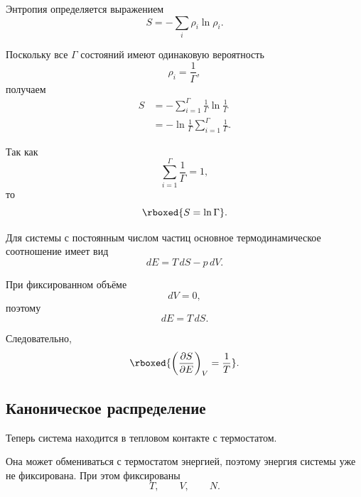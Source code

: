 \documentclass[../final.tex]{subfiles}
\begin{document}
Энтропия определяется выражением
%
\begin{equation*}
    S
    =
    -\sum_i
    \rho_i\ln\rho_i.
\end{equation*}

Поскольку все $\Gamma$ состояний имеют одинаковую вероятность
%
\begin{equation*}
    \rho_i
    =
    \frac{1}{\Gamma},
\end{equation*}
%
получаем
%
\begin{align*}
    S
    &=
    -\sum_{i=1}^{\Gamma}
    \frac{1}{\Gamma}
    \ln\frac{1}{\Gamma}
    \\[4pt]
    &=
    -\ln\frac{1}{\Gamma}
    \sum_{i=1}^{\Gamma}
    \frac{1}{\Gamma}.
\end{align*}

Так как
%
\begin{equation*}
    \sum_{i=1}^{\Gamma}
    \frac{1}{\Gamma}
    =
    1,
\end{equation*}
%
то
%
\[
    \rboxed{
        S = \ln\Gamma
    }.
\]

Для системы с постоянным числом частиц основное термодинамическое
соотношение имеет вид
%
\begin{equation*}
    dE
    =
    T\,dS
    -
    p\,dV.
\end{equation*}

При фиксированном объёме
%
\begin{equation*}
    dV = 0,
\end{equation*}
%
поэтому
%
\begin{equation*}
    dE
    =
    T\,dS.
\end{equation*}

Следовательно,
%
\[
    \rboxed{
        \left(
            \frac{\partial S}{\partial E}
        \right)_V
        =
        \frac{1}{T}
    }.
\]


\subsection{Каноническое распределение}

Теперь система находится в тепловом контакте с термостатом.

Она может обмениваться с термостатом энергией, поэтому энергия системы
уже не фиксирована. При этом фиксированы
%
\begin{equation*}
    T,
    \qquad
    V,
    \qquad
    N.
\end{equation*}
\end{document}
